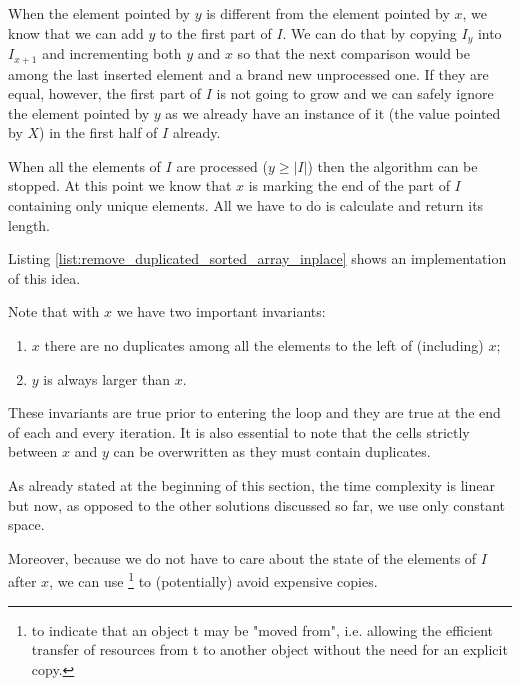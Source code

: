 When the element pointed by $y$ is different from the element pointed by $x$, we know that we can add
$y$ to the first part of $I$. We can do that by copying $I_y$ into $I_{x+1}$ and incrementing both
$y$ and $x$ so that the next comparison would be among the last inserted element and a brand new unprocessed one.
If they are equal, however, the first part of $I$ is not going to grow and we can
safely ignore the element pointed by $y$ as we already have an instance of it (the value pointed by $X$) in the first half of $I$ already.

When all the elements of $I$ are processed ($y \geq |I|$) then the algorithm can be stopped. 
At this point
we know that $x$ is marking the end of the part of $I$ containing only unique elements. 
All we have to do is calculate and return its length. 

Listing \ref{list:remove_duplicated_sorted_array_inplace} shows an implementation of this idea.




Note that with $x$ we have two important invariants:
\begin{enumerate}
	\item $x$ there are no duplicates among all the elements to the left of (including) $x$;
	\item $y$ is always larger than $x$.
\end{enumerate}

These invariants are true prior to entering the  loop and they are true at the end of each and every iteration. It is also essential to note that the cells strictly between $x$ and $y$ can be overwritten as they must contain duplicates.

As already stated at the beginning of this section, the time complexity is linear but now, as opposed to the other solutions discussed so far, we use only constant space. 

Moreover, because we do not have to care about the state of the elements of $I$ after $x$,
we can use \href{https://en.cppreference.com/w/cpp/utility/move}{}\footnote{ to indicate that an object t may be "moved from", i.e. allowing the efficient transfer of resources from t to another object without the need for an explicit copy.} to (potentially) avoid expensive copies.

